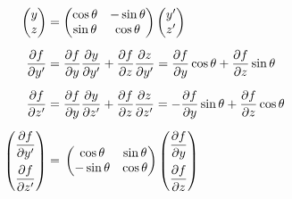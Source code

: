 \begin{align*}
\begin{pmatrix} y \\ z \end{pmatrix}
&=
\begin{pmatrix}
\cos\theta & -\sin\theta\\
\sin\theta & \cos\theta
\end{pmatrix}
\begin{pmatrix}  y' \\  z' \end{pmatrix} \\[6pt]
\frac{\partial f}{\partial y'}
&=
\frac{\partial f}{\partial y}\frac{\partial y}{\partial y'}
+
\frac{\partial f}{\partial z}\frac{\partial z}{\partial y'}
=
\frac{\partial f}{\partial y}\cos\theta
+
\frac{\partial f}{\partial z}\sin\theta \\[6pt]
\frac{\partial f}{\partial z'}
&=
\frac{\partial f}{\partial y}\frac{\partial y}{\partial z'}
+
\frac{\partial f}{\partial z}\frac{\partial z}{\partial z'}
=
-\frac{\partial f}{\partial y}\sin\theta
+
\frac{\partial f}{\partial z}\cos\theta \\[6pt]
\vphantom{\begin{pmatrix}
\dfrac{\partial f}{\partial y}\\
\dfrac{\partial f}{\partial z}
\end{pmatrix}}
\begin{pmatrix}
\dfrac{\partial f}{\partial y'}\\[10pt]
\dfrac{\partial f}{\partial z'}
\end{pmatrix}
&=
\vphantom{\begin{pmatrix}
\dfrac{\partial f}{\partial y}\\
\dfrac{\partial f}{\partial z}
\end{pmatrix}}
\begin{pmatrix}
\cos\theta & \sin\theta\\
-\sin\theta & \cos\theta
\end{pmatrix}
\begin{pmatrix}
\dfrac{\partial f}{\partial y}\\[10pt]
\dfrac{\partial f}{\partial z}
\end{pmatrix}
\end{align*}
